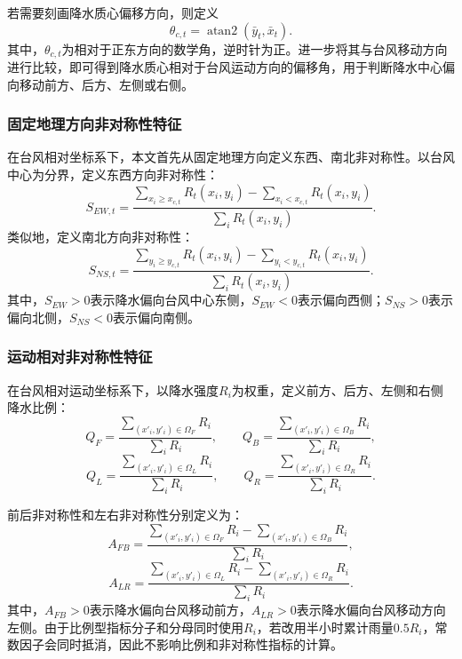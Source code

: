 \documentclass[UTF8,a4paper,zihao=5,fontset=fandol]{ctexart}
\numberwithin{equation}{section}
\numberwithin{figure}{section}
\numberwithin{table}{section}
\begin{document}
若需要刻画降水质心偏移方向，则定义
\begin{equation}
    \theta_{c,t}=\operatorname{atan2}(\bar{y}_t,\bar{x}_t).
\end{equation}
其中，$\theta_{c,t}$为相对于正东方向的数学角，逆时针为正。进一步将其与台风移动方向进行比较，即可得到降水质心相对于台风运动方向的偏移角，用于判断降水中心偏向移动前方、后方、左侧或右侧。

\subsubsection{固定地理方向非对称性特征}

在台风相对坐标系下，本文首先从固定地理方向定义东西、南北非对称性。以台风中心为分界，定义东西方向非对称性：
\begin{equation}
    S_{EW,t}=
    \frac{\sum_{x_i\geq x_{c,t}}R_t(x_i,y_i)-\sum_{x_i<x_{c,t}}R_t(x_i,y_i)}
    {\sum_i R_t(x_i,y_i)}.
\end{equation}
类似地，定义南北方向非对称性：
\begin{equation}
    S_{NS,t}=
    \frac{\sum_{y_i\geq y_{c,t}}R_t(x_i,y_i)-\sum_{y_i<y_{c,t}}R_t(x_i,y_i)}
    {\sum_i R_t(x_i,y_i)}.
\end{equation}
其中，$S_{EW}>0$表示降水偏向台风中心东侧，$S_{EW}<0$表示偏向西侧；$S_{NS}>0$表示偏向北侧，$S_{NS}<0$表示偏向南侧。

\subsubsection{运动相对非对称性特征}

在台风相对运动坐标系下，以降水强度$R_i$为权重，定义前方、后方、左侧和右侧降水比例：
\begin{equation}
    Q_F=\frac{\sum_{(x'_i,y'_i)\in\Omega_F}R_i}{\sum_i R_i},
    \qquad
    Q_B=\frac{\sum_{(x'_i,y'_i)\in\Omega_B}R_i}{\sum_i R_i},
\end{equation}
\begin{equation}
    Q_L=\frac{\sum_{(x'_i,y'_i)\in\Omega_L}R_i}{\sum_i R_i},
    \qquad
    Q_R=\frac{\sum_{(x'_i,y'_i)\in\Omega_R}R_i}{\sum_i R_i}.
\end{equation}

前后非对称性和左右非对称性分别定义为：
\begin{equation}
    A_{FB}=
    \frac{
    \sum_{(x'_i,y'_i)\in\Omega_F}R_i-
    \sum_{(x'_i,y'_i)\in\Omega_B}R_i
    }{\sum_i R_i},
\end{equation}
\begin{equation}
    A_{LR}=
    \frac{
    \sum_{(x'_i,y'_i)\in\Omega_L}R_i-
    \sum_{(x'_i,y'_i)\in\Omega_R}R_i
    }{\sum_i R_i}.
\end{equation}
其中，$A_{FB}>0$表示降水偏向台风移动前方，$A_{LR}>0$表示降水偏向台风移动方向左侧。由于比例型指标分子和分母同时使用$R_i$，若改用半小时累计雨量$0.5R_i$，常数因子会同时抵消，因此不影响比例和非对称性指标的计算。
\end{document}
